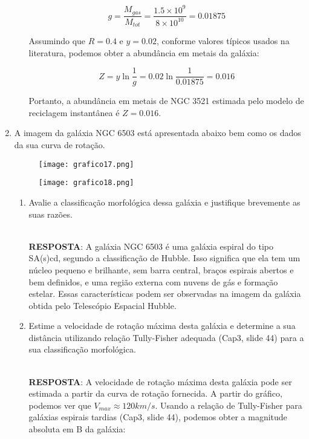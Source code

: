 \documentclass[a4paper,12pt]{article}
\begin{document}
\begin{enumerate}
\begin{enumerate}
\begin{equation*}
g = \frac{M_{gas}}{M_{tot}} = \frac{1.5\times 10^9}{8\times 10^{10}} = 0.01875
\end{equation*}

Assumindo que $R=0.4$ e $y=0.02$, conforme valores típicos usados na literatura, podemos obter a abundância em metais da galáxia:

\begin{equation*}
Z = y \ln \frac{1}{g} = 0.02 \ln \frac{1}{0.01875} = 0.016
\end{equation*}

Portanto, a abundância em metais de NGC 3521 estimada pelo modelo de reciclagem instantânea é $Z=0.016$.
\end{enumerate}

\item A imagem da galáxia NGC 6503 está apresentada abaixo bem como os dados da sua curva de rotação. 
\begin{figure}[H]
\centering
\texttt{[image: grafico17.png]}
\end{figure}

\begin{figure}[H]
\centering
\texttt{[image: grafico18.png]}
\end{figure}

\begin{enumerate}

\item Avalie a classificação morfológica dessa galáxia e justifique brevemente as suas razões.

\noindent\hrulefill\\\textbf{RESPOSTA}: A galáxia NGC 6503 é uma galáxia espiral do tipo SA(s)cd, segundo a classificação de Hubble. Isso significa que ela tem um núcleo pequeno e brilhante, sem barra central, braços espirais abertos e bem definidos, e uma região externa com nuvens de gás e formação estelar. Essas características podem ser observadas na imagem da galáxia obtida pelo Telescópio Espacial Hubble.

\noindent\hrulefill

\item Estime a velocidade de rotação máxima desta galáxia e determine a sua distância utilizando relação Tully-Fisher adequada (Cap3, slide 44) para a sua classificação morfológica.

\noindent\hrulefill\\\textbf{RESPOSTA}: A velocidade de rotação máxima desta galáxia pode ser estimada a partir da curva de rotação fornecida. A partir do gráfico, podemos ver que $V_{max} \approx 120 km/s$. Usando a relação de Tully-Fisher para galáxias espirais tardias (Cap3, slide 44), podemos obter a magnitude absoluta em B da galáxia:


\end{enumerate}
\end{enumerate}
\end{document}
